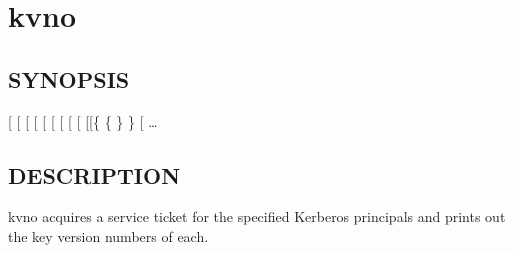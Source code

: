 \documentclass[letterpaper,10pt,english]{sphinxmanual}
\begin{document}
\section{kvno}
\label{\detokenize{user/user_commands/kvno:kvno-1}}\label{\detokenize{user/user_commands/kvno::doc}}\label{\detokenize{user/user_commands/kvno:kvno}}

\subsection{SYNOPSIS}
\label{\detokenize{user/user_commands/kvno:synopsis}}
{[} \sphinxstyleemphasis{ccache}{]}
{[} \sphinxstyleemphasis{etype}{]}
{[} \sphinxstyleemphasis{keytab}{]}
{[}\sphinxstylestrong{-q}{]}
{[} \textbar{}  \sphinxstyleemphasis{sname}{]}
{[}\sphinxstylestrong{-P}{]}
{[}\sphinxstylestrong{\textendash{}cached-only}{]}
{[}\sphinxstylestrong{\textendash{}no-store}{]}
{[} \sphinxstyleemphasis{cache}{]}
{[}{[}\{  \textbar{} \{ \textbar{} \} \} {[}\sphinxstylestrong{-P}{]}{]} \textbar{}  \sphinxstyleemphasis{ccache}{]}
 …


\subsection{DESCRIPTION}
\label{\detokenize{user/user_commands/kvno:description}}
kvno acquires a service ticket for the specified Kerberos principals
and prints out the key version numbers of each.
\end{document}
